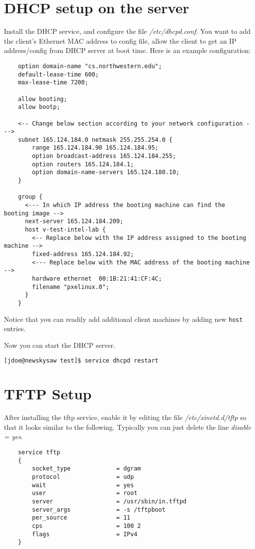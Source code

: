 \documentclass[11pt]{article}
\begin{document}
\section{DHCP setup on the server}

Install the DHCP service, and configure the file {\em
/etc/dhcpd.conf}.  You want to add the client's Ethernet MAC address
to config file, allow the client to get an IP address/config from
DHCP server at boot time.   Here is an example configuration:  
\begin{verbatim}
    option domain-name "cs.northwestern.edu";
    default-lease-time 600;
    max-lease-time 7200;

    allow booting;
    allow bootp;

    <-- Change below section according to your network configuration --->
    subnet 165.124.184.0 netmask 255.255.254.0 {
        range 165.124.184.90 165.124.184.95;
        option broadcast-address 165.124.184.255;
        option routers 165.124.184.1;
        option domain-name-servers 165.124.180.10;
    }

    group {
      <--- In which IP address the booting machine can find the booting image -->
      next-server 165.124.184.209;
      host v-test-intel-lab {
        <-- Replace below with the IP address assigned to the booting machine -->
        fixed-address 165.124.184.92;
        <--- Replace below with the MAC address of the booting machine -->
        hardware ethernet  00:1B:21:41:CF:4C;   
        filename "pxelinux.0";
      }
    } 
\end{verbatim}

Notice that you can readily add additional client machines by adding
new \verb.host. entries.

Now you can start the DHCP server.
\begin{verbatim}
[jdoe@newskysaw test]$ service dhcpd restart
\end{verbatim}


\section{TFTP Setup}

After installing the tftp service, enable it by editing the file {\em
/etc/xinetd.d/tftp} so that it looks similar to the following.
Typically you can just delete the line {\em disable = yes}.

\begin{verbatim}
    service tftp
    {
        socket_type             = dgram
        protocol                = udp
        wait                    = yes
        user                    = root
        server                  = /usr/sbin/in.tftpd
        server_args             = -s /tftpboot
        per_source              = 11
        cps                     = 100 2
        flags                   = IPv4
    }

\end{verbatim}
\end{document}
